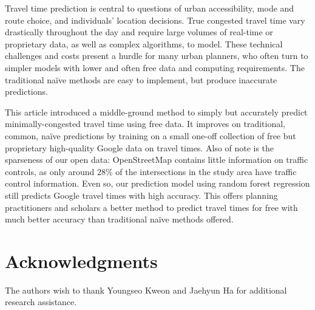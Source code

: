 \documentclass[12pt,letterpaper]{article} %
\begin{document}
Travel time prediction is central to questions of urban accessibility, mode and route choice, and individuals' location decisions. True congested travel time vary drastically throughout the day and require large volumes of real-time or proprietary data, as well as complex algorithms, to model. These technical challenges and costs present a hurdle for many urban planners, who often turn to simpler models with lower and often free data and computing requirements. The traditional naïve methods are easy to implement, but produce inaccurate predictions.

This article introduced a middle-ground method to simply but accurately predict minimally-congested travel time using free data. It improves on traditional, common, naïve predictions by training on a small one-off collection of free but proprietary high-quality Google data on travel times. Also of note is the sparseness of our open data: OpenStreetMap contains little information on traffic controls, as only around 28\% of the intersections in the study area have traffic control information. Even so, our prediction model using random forest regression still predicts Google travel times with high accuracy. This offers planning practitioners and scholars a better method to predict travel times for free with much better accuracy than traditional naïve methods offered.

\section*{Acknowledgments}

The authors wish to thank Youngseo Kweon and Jaehyun Ha for additional research assistance.


\setlength{\bibsep}{0.00cm plus 0.05cm} %


\end{document}
